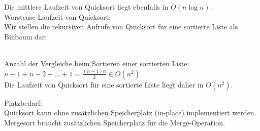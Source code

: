 \documentclass[a4paper]{scrartcl}
\begin{document}
Die mittlere Laufzeit von Quicksort liegt ebenfalls in $O(n \log{n})$.\\
Worstcase Laufzeit von Quicksort:\\
Wir stellen die rekursiven Aufrufe von Quicksort für eine sortierte Liste als Binbaum dar:\\
\\
Anzahl der Vergleiche beim Sortieren einer sortierten Liste:\\
$n-1 + n-2 + ... + 1 = \frac{(n-1)n}{2} \in O(n^2)$\\
Die Laufzeit von Quicksort für eine sortierte Liste liegt daher in $O(n^2)$.\\

Platzbedarf:\\
Quicksort kann ohne zusätzlichen Speicherplatz (in-place) implementiert werden.\\
Mergesort braucht zusätzlichen Speicherplatz für die Merge-Operation.
\end{document}
